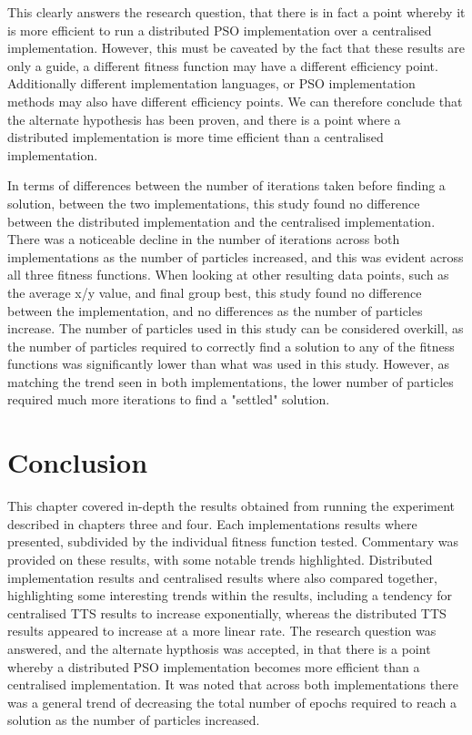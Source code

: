 \documentclass[oneside,12pt]{book}
\begin{document}
This clearly answers the research question, that there is in fact a point whereby it is more efficient to run a distributed PSO implementation over a centralised implementation. However, this must be caveated by the fact that these results are only a guide, a different fitness function may have a different efficiency point. Additionally different implementation languages, or PSO implementation methods may also have different efficiency points. 
We can therefore conclude that the alternate hypothesis has been proven, and there is a point where a distributed implementation is more time efficient than a centralised implementation. 

In terms of differences between the number of iterations taken before finding a solution, between the two implementations, this study found no difference between the distributed implementation and the centralised implementation. There was a noticeable decline in the number of iterations across both implementations as the number of particles increased, and this was evident across all three fitness functions. When looking at other resulting data points, such as the average x/y value, and final group best, this study found no difference between the implementation, and no differences as the number of particles increase. The number of particles used in this study can be considered overkill, as the number of particles required to correctly find a solution to any of the fitness functions was significantly lower than what was used in this study. However, as matching the trend seen in both implementations, the lower number of particles required much more iterations to find a "settled" solution. 


\section{Conclusion}
This chapter covered in-depth the results obtained from running the experiment described in chapters three and four. Each implementations results where presented, subdivided by the individual fitness function tested. Commentary was provided on these results, with some notable trends highlighted. 
Distributed implementation results and centralised results where also compared together, highlighting some interesting trends within the results, including a tendency for centralised TTS results to increase exponentially, whereas the distributed TTS results appeared to increase at a more linear rate. The research question was answered, and the alternate hypthosis was accepted, in that there is a point whereby a distributed PSO implementation becomes more efficient than a centralised implementation. It was noted that across both implementations there was a general trend of decreasing the total number of epochs required to reach a solution as the number of particles increased.
\end{document}
